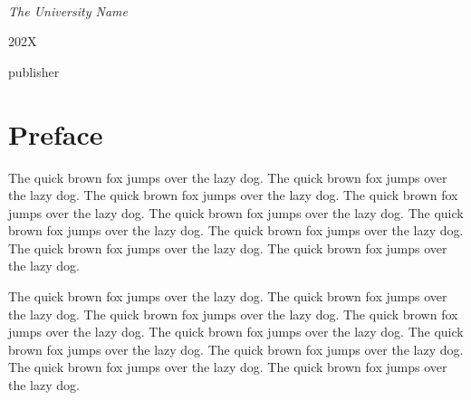\documentclass[openany,twoside,12pt]{book}
\theoremstyle{plain}
\numberwithin{equation}{chapter}
\numberwithin{figure}{chapter}
\numberwithin{table}{chapter}
\newcommand{\plogo}{\fbox{$\mathcal{PL}$}} %
\begin{document}
\begin{titlepage}
	{\scshape\Large \@author \\} %
	
	\vspace{0.5\baselineskip} %
	
	\textit{The University Name} %
	
	\vfill %
	
    \makeatletter

	
	\plogo %
	
	\vspace{0.3\baselineskip} %
	
	202X %

	{\large publisher} %

\end{titlepage}


\thispagestyle{empty}

\frontmatter


\chapter{Preface}

The quick brown fox jumps over the lazy dog. The quick brown fox jumps over the lazy dog. The quick brown fox jumps over the lazy dog. The quick brown fox jumps over the lazy dog. The quick brown fox jumps over the lazy dog. The quick brown fox jumps over the lazy dog. The quick brown fox jumps over the lazy dog. The quick brown fox jumps over the lazy dog. The quick brown fox jumps over the lazy dog.


The quick brown fox jumps over the lazy dog. The quick brown fox jumps over the lazy dog. The quick brown fox jumps over the lazy dog. The quick brown fox jumps over the lazy dog. The quick brown fox jumps over the lazy dog. The quick brown fox jumps over the lazy dog. The quick brown fox jumps over the lazy dog. The quick brown fox jumps over the lazy dog. The quick brown fox jumps over the lazy dog.



\cleardoublepage
{}
{}
\tableofcontents
\end{document}
